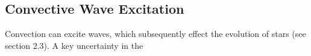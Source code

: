 {\color{purple}
\subsection{Convective Wave Excitation}
}



Convection can excite waves, which subsequently effect the evolution of stars (see section 2.3). A key uncertainty in the 
